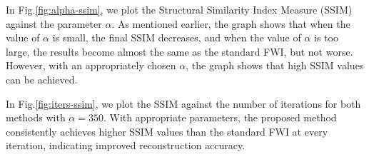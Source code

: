 
In Fig.\ref{fig:alpha-ssim}, we plot the Structural Similarity Index Measure (SSIM) against the parameter $\alpha$.
As mentioned earlier, the graph shows that when the value of $\alpha$ is small, the final SSIM decreases, and when the value of $\alpha$ is too large, the results become almost the same as the standard FWI, but not worse.
However, with an appropriately chosen $\alpha$, the graph shows that high SSIM values can be achieved.


In Fig.\ref{fig:iters-ssim}, we plot the SSIM against the number of iterations for both methods with $\alpha=350$.
With appropriate parameters, the proposed method consistently achieves higher SSIM values than the standard FWI at every iteration, indicating improved reconstruction accuracy.

